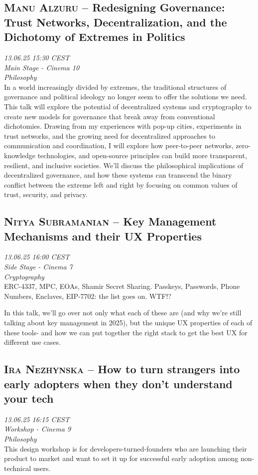 \subsection {\textsc{Manu Alzuru}  -- Redesigning Governance: Trust Networks, Decentralization, and the Dichotomy of Extremes in Politics} \noindent \textit {13.06.25 15:30 CEST\\ Main Stage - Cinema 10\\ Philosophy}\\[1em] In a world increasingly divided by extremes, the traditional structures of governance and political ideology no longer seem to offer the solutions we need. This talk will explore the potential of decentralized systems and cryptography to create new models for governance that break away from conventional dichotomies. Drawing from my experiences with pop-up cities, experiments in trust networks, and the growing need for decentralized approaches to communication and coordination, I will explore how peer-to-peer networks, zero-knowledge technologies, and open-source principles can build more transparent, resilient, and inclusive societies. We’ll discuss the philosophical implications of decentralized governance, and how these systems can transcend the binary conflict between the extreme left and right by focusing on common values of trust, security, and privacy.

\clearpage
\subsection {\textsc{Nitya Subramanian}  -- Key Management Mechanisms and their UX Properties} \noindent \textit {13.06.25 16:00 CEST\\ Side Stage - Cinema 7\\ Cryptography}\\[1em] ERC-4337, MPC, EOAs, Shamir Secret Sharing. Passkeys, Passwords, Phone Numbers, Enclaves, EIP-7702: the list goes on. WTF!?

In this talk, we'll go over not only what each of these are (and why we're still talking about key management in 2025), but the unique UX properties of each of these tools- and how we can put together  the right stack to get the best UX for different use cases.

\clearpage
\subsection {\textsc{Ira Nezhynska}  -- How to turn strangers into early adopters when they don't understand your tech} \noindent \textit {13.06.25 16:15 CEST\\ Workshop - Cinema 9\\ Philosophy}\\[1em] This design workshop is for developers-turned-founders who are launching their product to market and want to set it up for successful early adoption among non-technical users.

